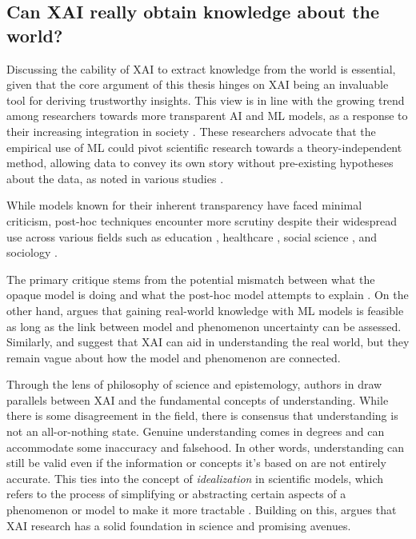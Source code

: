 \subsection{Can XAI really obtain knowledge about the world?}
\label{xai_can_fail_but_is_usable}

Discussing the cability of XAI to extract knowledge from the world is essential, given that the core argument of this thesis hinges on XAI being an invaluable tool for deriving trustworthy insights. This view is in line with the growing trend among researchers towards more transparent AI and ML models, as a response to their increasing integration in society \cite{Arya2019OneTechniques}. These researchers advocate that the empirical use of ML could pivot scientific research towards a theory-independent method, allowing data to convey its own story without pre-existing hypotheses about the data, as noted in various studies \cite{Kitchin2014BigShifts, Anderson2008TheObsolete, Naimi2014BigThink, Andrews2023TheIdeal, LiebersonImplicationSciences}.

While models known for their inherent transparency have faced minimal criticism, post-hoc techniques encounter more scrutiny  despite their widespread use across various fields such as education \cite{Lezhnina2022CombiningPISA, Martinez-Abad2020EducationalAssessment}, healthcare \cite{Jauhiainen2021NewAthletes, Stiglic2020InterpretabilityHealthcare}, social science \cite{Berger2023ExplainableChains, Bellantuono2023DetectingIntelligence}, and sociology \cite{Li2023ApplyingPandemic, Fan2023InterpretableInequality}.


The primary critique stems from the potential mismatch between what the opaque model is doing and what the post-hoc model attempts to explain \cite{Rudin2019StopInstead, Mullainathan2017MachineApproach, Babic2021BewareCare}. On the other hand, \cite{Sullivan2022UnderstandingModels} argues that gaining real-world knowledge with ML models is feasible as long as the link between model and phenomenon uncertainty can be assessed. Similarly, \cite{Cichy2019DeepModels} and \cite{Zednik2021SolvingIntelligence} suggest that XAI can aid in understanding the real world, but they remain vague about how the model and phenomenon are connected.

Through the lens of philosophy of science and epistemology, authors in \cite{Fleisher2022UnderstandingAI} draw parallels between XAI and the fundamental concepts of understanding. While there is some disagreement in the field, there is consensus that understanding is not an all-or-nothing state. Genuine understanding comes in degrees and can accommodate some inaccuracy and falsehood. In other words, understanding can still be valid even if the information or concepts it's based on are not entirely accurate. This ties into the concept of \textit{idealization} in scientific models, which refers to the process of simplifying or abstracting certain aspects of a phenomenon or model to make it more tractable \cite{Jebeile2015ExplainingIdealizations}. Building on this, \cite{Fleisher2022UnderstandingAI} argues that XAI research has a solid foundation in science and promising avenues.

